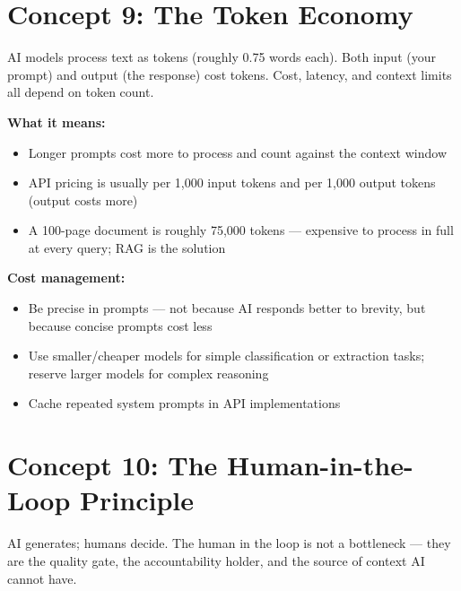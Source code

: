 \section{Concept 9: The Token Economy}
\label{sec:tokens}

\begin{conceptbox}
AI models process text as tokens (roughly 0.75 words each).
Both input (your prompt) and output (the response) cost tokens.
Cost, latency, and context limits all depend on token count.
\end{conceptbox}

\textbf{What it means:}
\begin{itemize}
  \item Longer prompts cost more to process and count against the context window
  \item API pricing is usually per 1,000 input tokens and per 1,000 output tokens
    (output costs more)
  \item A 100-page document is roughly 75,000 tokens --- expensive to process in
    full at every query; RAG is the solution
\end{itemize}

\textbf{Cost management:}
\begin{itemize}
  \item Be precise in prompts --- not because AI responds better to brevity,
    but because concise prompts cost less
  \item Use smaller/cheaper models for simple classification or extraction tasks;
    reserve larger models for complex reasoning
  \item Cache repeated system prompts in API implementations
\end{itemize}

\section{Concept 10: The Human-in-the-Loop Principle}
\label{sec:hitl}

\begin{conceptbox}
AI generates; humans decide.
The human in the loop is not a bottleneck --- they are the quality gate, the
accountability holder, and the source of context AI cannot have.
\end{conceptbox}

